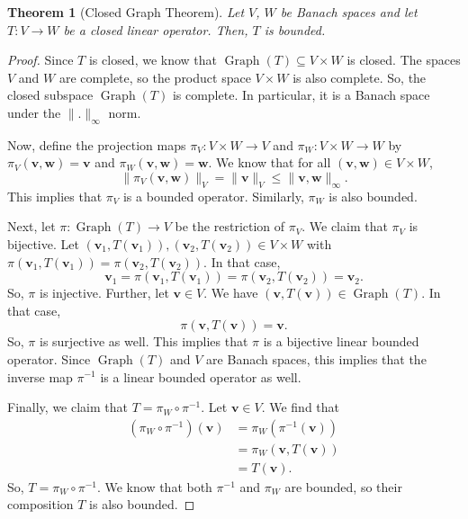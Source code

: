 \documentclass[a4paper, openany]{memoir}
\theoremstyle{definition}
\theoremstyle{plain}
\newtheorem{theorem}[definition]{Theorem}
\begin{document}
    \begin{theorem}[Closed Graph Theorem]
        Let $V$, $W$ be Banach spaces and let $T: V \to W$ be a closed linear operator. Then, $T$ is bounded.
    \end{theorem}
    \begin{proof}
        Since $T$ is closed, we know that $\operatorname{Graph} (T) \subseteq V \times W$ is closed. The spaces $V$ and $W$ are complete, so the product space $V \times W$ is also complete. So, the closed subspace $\operatorname{Graph} (T)$ is complete. In particular, it is a Banach space under the $\lVert . \rVert_\infty$ norm.

        \noindent Now, define the projection maps $\pi_V: V \times W \to V$ and $\pi_W: V \times W \to W$ by $\pi_V(\bm{v}, \bm{w}) = \bm{v}$ and $\pi_W(\bm{v}, \bm{w}) = \bm{w}$. We know that for all $(\bm{v}, \bm{w}) \in V \times W$,
        \[\lVert \pi_V(\bm{v}, \bm{w}) \rVert_V = \lVert \bm{v} \rVert_V \leq \lVert \bm{v}, \bm{w} \rVert_\infty.\]
        This implies that $\pi_V$ is a bounded operator. Similarly, $\pi_W$ is also bounded.

        \noindent Next, let $\pi: \operatorname{Graph}(T) \to V$ be the restriction of $\pi_V$. We claim that $\pi_V$ is bijective. Let $(\bm{v}_1, T(\bm{v}_1)), (\bm{v}_2, T(\bm{v}_2)) \in V \times W$ with $\pi(\bm{v}_1, T(\bm{v}_1)) = \pi(\bm{v}_2, T(\bm{v}_2))$. In that case,
        \[\bm{v}_1 = \pi(\bm{v}_1, T(\bm{v}_1)) = \pi(\bm{v}_2, T(\bm{v}_2)) = \bm{v}_2.\]
        So, $\pi$ is injective. Further, let $\bm{v} \in V$. We have $(\bm{v}, T(\bm{v})) \in \operatorname{Graph}(T)$. In that case,
        \[\pi(\bm{v}, T(\bm{v})) = \bm{v}.\]
        So, $\pi$ is surjective as well. This implies that $\pi$ is a bijective linear bounded operator. Since $\operatorname{Graph} (T)$ and $V$ are Banach spaces, this implies that the inverse map $\pi^{-1}$ is a linear bounded operator as well.

        \noindent Finally, we claim that $T = \pi_W \circ \pi^{-1}$. Let $\bm{v} \in V$. We find that
        \begin{align*}
            (\pi_W \circ \pi^{-1})(\bm{v}) &= \pi_W(\pi^{-1}(\bm{v})) \\
            &= \pi_W(\bm{v}, T(\bm{v})) \\
            &= T(\bm{v}).
        \end{align*}
        So, $T = \pi_W \circ \pi^{-1}$. We know that both $\pi^{-1}$ and $\pi_W$ are bounded, so their composition $T$ is also bounded.
    \end{proof}
\end{document}
